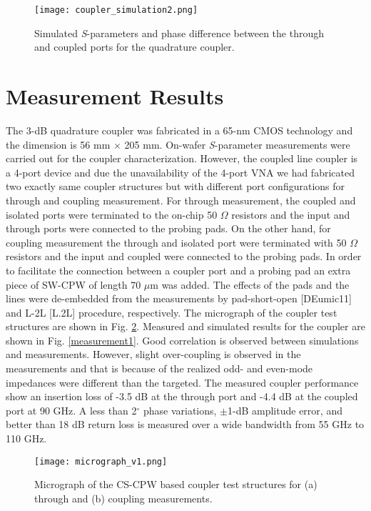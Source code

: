 \documentclass[journal]{IEEEtran}
\begin{document}
\begin{figure}
	\texttt{[image: coupler\_simulation2.png]}
	\caption{Simulated \textit{S}-parameters and phase difference between the through and coupled ports for the quadrature coupler.}
	\label{simulated_results}
\end{figure}

\section{Measurement Results}

The 3-dB quadrature coupler was fabricated in a 65-nm CMOS technology and the dimension is 56 mm $\times$ 205 mm. On-wafer \textit{S}-parameter measurements were carried out for the coupler characterization. However, the coupled line coupler is a 4-port device and due the unavailability of the 4-port VNA we had fabricated two exactly same coupler structures but with different port configurations for through and coupling measurement. For through measurement, the coupled and isolated ports were terminated to the on-chip 50 $\Omega$ resistors and the input and through ports were connected to the probing pads. On the other hand, for coupling measurement the through and isolated port were terminated with 50 $\Omega$ resistors and the input and coupled were connected to
the probing pads. In order to facilitate the connection between a coupler port and a probing pad an extra piece of SW-CPW of length 70 $\mu$m was added. The effects of the pads and the lines were de-embedded from the measurements by pad-short-open [DEumic11] and L-2L [L.2L] procedure, respectively. The micrograph of the coupler test structures are shown in Fig. \ref{micrograph}. Measured and simulated results for the coupler are shown in Fig. \ref{measurement1}. Good correlation is observed between simulations and measurements. However, slight over-coupling is observed in the measurements and
that is because of the realized odd- and even-mode impedances were different than the targeted. The measured coupler performance show an insertion loss of -3.5 dB at the through port and -4.4 dB at the coupled port at 90 GHz. A less than 2$^\circ$ phase variations, $\pm$1-dB amplitude error, and better than 18 dB return loss is measured over a wide bandwidth from 55 GHz to 110 GHz.

\begin{figure}
	\texttt{[image: micrograph\_v1.png]}
	\caption{Micrograph of the CS-CPW based coupler test structures for (a) through and (b) coupling measurements.}
	\label{micrograph}
\end{figure}
\end{document}
